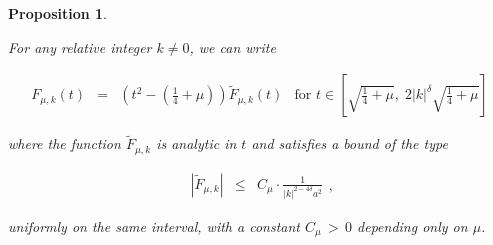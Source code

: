 \documentclass{jams-l}
\newtheorem{proposition}[theorem]{Proposition}
\theoremstyle{definition}
\theoremstyle{remark}
\numberwithin{equation}{section}
\begin{document}
            \begin{proposition}
            \label{PropGlobalStudy}
        
                For any relative integer $k \neq 0$, we can write
            
                \[ \begin{array}{llll}
                        F_{\mu,k} \left( t \right) & = & \left( t^2 - \left( \frac{1}{4} + \mu \right) \right) \widetilde{F}_{\mu,k} \left( t \right) & \text{for } t \in \left[ \sqrt{\frac{1}{4} + \mu}, \; 2 \left \vert k \right \vert^{\delta} \sqrt{\frac{1}{4} + \mu} \right]
                    \end{array} \]
            
                \noindent where the function $\widetilde{F}_{\mu,k}$ is analytic in $t$ and satisfies a bound of the type
            
                \[ \begin{array}{ccc}
                        \left \vert \widetilde{F}_{\mu,k} \right \vert & \leqslant & C_{\mu} \cdot \frac{1}{\left \vert k \right \vert^{2-4\delta} a^2}
                    \end{array} , \]
            
                \noindent uniformly on the same interval, with a constant $C_{\mu} \, > \, 0$ depending only on $\mu$.
        
            \end{proposition}
        
\end{document}
